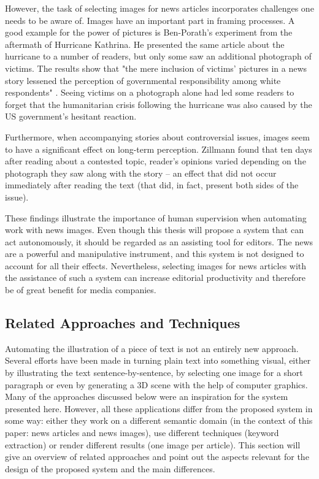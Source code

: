 \documentclass[11pt,a4paper,twoside]{article}
\begin{document}
However, the task of selecting images for news articles incorporates challenges one needs to be aware of. Images have an important part in framing processes. A good example for the power of pictures is Ben-Porath's experiment from the aftermath of Hurricane Kathrina. \cite{Ben-Porath2010NewsKatrina} He presented the same article about the hurricane to a number of readers, but only some saw an additional photograph of victims. The results show that "the mere inclusion of victims’ pictures in a news story lessened the perception of governmental responsibility among white respondents" \cite[p. 482]{Ben-Porath2010NewsKatrina}. Seeing victims on a photograph alone had led some readers to forget that the humanitarian crisis following the hurricane was also caused by the US government's hesitant reaction.

Furthermore, when accompanying stories about controversial issues, images seem to have a significant effect on long-term perception. Zillmann found that ten days after reading about a contested topic, reader's opinions varied depending on the photograph they saw along with the story -- an effect that did not occur immediately after reading the text (that did, in fact, present both sides of the issue). \cite{Zillmann1999EffectsPerception}

These findings illustrate the importance of human supervision when automating work with news images. Even though this thesis will propose a system that can act autonomously, it should be regarded as an assisting tool for editors. The news are a powerful and manipulative instrument, and this system is not designed to account for all their effects. Nevertheless, selecting images for news articles with the assistance of such a system can increase editorial productivity and therefore be of great benefit for media companies.

\subsection{Related Approaches and Techniques} \label{TheoryTech}

Automating the illustration of a piece of text is not an entirely new approach. Several efforts have been made in turning plain text into something visual, either by illustrating the text sentence-by-sentence, by selecting one image for a short paragraph or even by generating a 3D scene with the help of computer graphics. Many of the approaches discussed below were an inspiration for the system presented here. However, all these applications differ from the proposed system in some way: either they work on a different semantic domain (in the context of this paper: news articles and news images), use different techniques (keyword extraction) or render different results (one image per article). This section will give an overview of related approaches and point out the aspects relevant for the design of the proposed system and the main differences.
\end{document}
